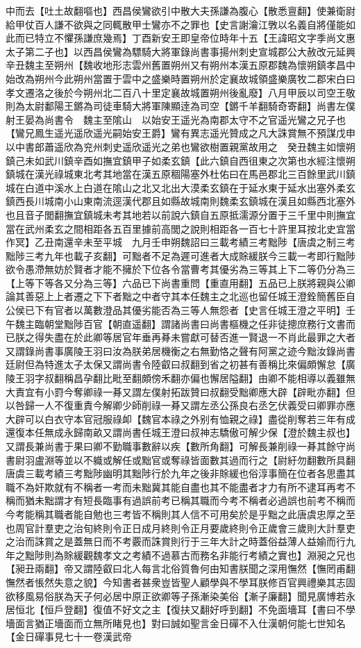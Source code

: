 中而去【吐土故翻嘔也】西昌侯鸞欲引中散大夫孫謙為腹心【散悉亶翻】使兼衛尉給甲仗百人謙不欲與之同輒散甲士鸞亦不之罪也【史言謝瀹江斆以名義自將僅能如此而已特立不懼孫謙庶幾焉】丁酉新安王即皇帝位時年十五【王諱昭文字季尚文惠太子第二子也】以西昌侯鸞為驃騎大將軍錄尚書事揚州刺史宣城郡公大赦改元延興　辛丑魏主至朔州【魏收地形志雲州舊置朔州又有朔州本漢五原郡魏為懷朔鎮孝昌中始改為朔州今此朔州當置于雲中之盛樂時置朔州於定襄故城領盛樂廣牧二郡宋白曰孝文遷洛之後於今朔州北二百八十里定襄故城置朔州後亂廢】八月甲辰以司空王敬則為太尉鄱陽王鏘為司徒車騎大將軍陳顯逹為司空【鏘千羊翻騎奇寄翻】尚書左僕射王晏為尚書令　魏主至隂山　以始安王遥光為南郡太守不之官遥光鸞之兄子也【鸞兄鳳生遥光遥欣遥光嗣始安王爵】鸞有異志遥光贊成之凡大誅賞無不預謀戊申以中書郎蕭遥欣為兖州刺史遥欣遥光之弟也鸞欲樹置親黨故用之　癸丑魏主如懷朔鎮己未如武川鎮辛酉如撫宜鎮甲子如柔玄鎮【此六鎮自西徂東之次第也水經注懷朔鎮城在漢光祿城東北考其地當在漢五原稒陽塞外杜佑曰在馬邑郡北三百餘里武川鎮城在白道中溪水上白道在隂山之北又北出大漠柔玄鎮在于延水東于延水出塞外柔玄鎮西長川城南小山東南流逕漢代郡且如縣故城南則魏柔玄鎮城在漢且如縣西北塞外也且音子閭翻撫宜鎮城未考其地若以前說六鎮自五原抵濡源分置于三千里中則撫宜當在武州柔玄之間相距各五百里據前高閭之說則相距各一百七十許里耳按北史宜當作冥】乙丑南還辛未至平城　九月壬申朔魏詔曰三載考績三考黜陟【唐虞之制三考黜陟三考九年也載子亥翻】可黜者不足為遲可進者大成賖緩朕今三載一考即行黜陟欲令愚滯無妨於賢者才能不擁於下位各令當曹考其優劣為三等其上下二等仍分為三【上等下等各又分為三等】六品已下尚書重問【重直用翻】五品已上朕將親與公卿論其善惡上上者遷之下下者黜之中者守其本任魏主之北巡也留任城王澄銓簡舊臣自公侯已下有官者以萬數澄品其優劣能否為三等人無怨者【史言任城王澄之平明】壬午魏主臨朝堂黜陟百官【朝直遥翻】謂諸尚書曰尚書樞機之任非徒摠庶務行文書而已朕之得失盡在於此卿等居官年垂再朞未嘗獻可替否進一賢退一不肖此最罪之大者又謂錄尚書事廣陵王羽曰汝為朕弟居機衡之右無勤恪之聲有阿黨之迹今黜汝錄尚書廷尉但為特進太子太保又謂尚書令陸叡曰叔翻到省之初甚有善稱比來偏頗懈怠【廣陵王羽字叔翻稱昌孕翻比毗至翻頗傍禾翻亦偏也懈居隘翻】由卿不能相導以義雖無大責宜有小罸今奪卿祿一朞又謂左僕射拓跋贊曰叔翻受黜卿應大辟【辟毗亦翻】但以咎歸一人不復重責今解卿少師削祿一朞又謂左丞公孫良右丞乞伏義受曰卿罪亦應大辟可以白衣守本官冠服祿卹【魏官本祿之外别有恤親之祿】盡從削奪若三年有成還復本任無成永歸南畝又謂尚書任城王澄曰叔神志驕傲可解少保【澄於魏主叔也】又謂長兼尚書于果曰卿不勤職事數辭以疾【數所角翻】可解長兼削祿一朞其餘守尚書尉羽盧淵等並以不軄或解任或黜官或奪祿皆面數其過而行之【尉紆勿翻數所具翻唐虞三載考績三考黜陟幽明其黜陟行於九年之後非賖緩也俗淳事簡在位者各思盡其職不為奸欺就有不稱者一考而未黜冀其能自盡也其不能盡者才力有所不逮耳再考不稱而猶未黜謂才有短長臨事有過誤前考已稱其職而今考不稱者必過誤也前考不稱而今考能稱其職者能自勉也三考皆不稱則其人信不可用矣於是乎黜之此唐虞忠厚之至也周官計羣吏之治旬終則令正日成月終則令正月要歲終則令正歲會三歲則大計羣吏之治而誅賞之是蓋無日而不考覈而誅賞則行于三年大計之時蓋俗益薄人益媮而行九年之黜陟則為賖緩觀魏孝文之考績不過慕古而務名非能行考績之實也】淵昶之兄也【昶丑兩翻】帝又謂陸叡曰北人每言北俗質魯何由知書朕聞之深用憮然【憮罔甫翻憮然者悵然失意之貌】今知書者甚衆豈皆聖人顧學與不學耳朕修百官興禮樂其志固欲移風易俗朕為天子何必居中原正欲卿等子孫漸染美俗【漸子廉翻】聞見廣博若永居恒北【恒戶登翻】復值不好文之主【復扶又翻好呼到翻】不免面墻耳【書曰不學墻面言猶正墻面而立無所睹見也】對曰誠如聖言金日磾不入仕漢朝何能七世知名【金日磾事見七十一卷漢武帝